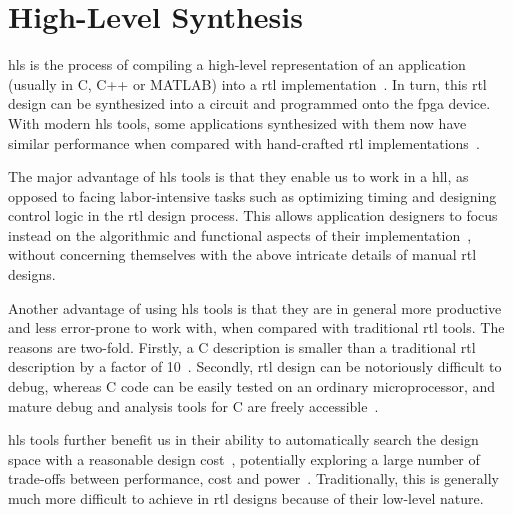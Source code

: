 \section{High-Level Synthesis}
\label{bg:sec:high_level_synthesis}

\Gls{hls} is the process of compiling a high-level representation
of an application (usually in C, C++ or MATLAB) into a \gls{rtl}
implementation~\cite{coussy, gajski}.  In turn, this \gls{rtl} design
can be synthesized into a circuit and programmed onto the \gls{fpga}
device.  With modern \gls{hls} tools, some applications synthesized with
them now have similar performance when compared with hand-crafted \gls{rtl}
implementations~\cite{bdti}.

The major advantage of \gls{hls} tools is that they enable us to work in a
\gls{hll}, as opposed to facing labor-intensive tasks such as optimizing timing
and designing control logic in the \gls{rtl} design process.  This allows
application designers to focus instead on the algorithmic and functional
aspects of their implementation~\cite{coussy}, without concerning themselves
with the above intricate details of manual \gls{rtl} designs.

Another advantage of using \gls{hls} tools is that they are in general
more productive and less error-prone to work with, when compared with
traditional \gls{rtl} tools.  The reasons are two-fold.  Firstly, a C
description is smaller than a traditional \gls{rtl} description by a factor
of 10~\cite{coussy, bdti}.  Secondly, \gls{rtl} design can be notoriously
difficult to debug, whereas C code can be easily tested on an ordinary
microprocessor, and mature debug and analysis tools for C are freely
accessible~\cite{canis13}.

\Gls{hls} tools further benefit us in their ability to automatically search
the design space with a reasonable design cost~\cite{bdti}, potentially
exploring a large number of trade-offs between performance, cost and
power~\cite{mcfarland}.  Traditionally, this is generally much more difficult
to achieve in \gls{rtl} designs because of their low-level nature.


